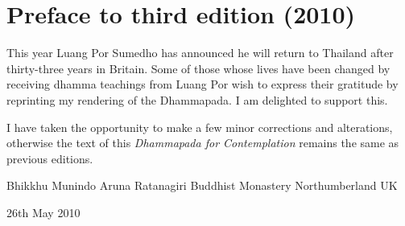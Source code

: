 
\chapter{Preface to third edition (2010)}

This year Luang Por Sumedho has announced he will return to Thailand after thirty-three years in Britain. Some  of  those whose  lives  have  been  changed  by  receiving dhamma  teachings  from  Luang  Por  wish to  express  their  gratitude  by  reprinting my rendering of the Dhammapada. I am delighted to support this. 

I have taken the opportunity to make a few minor corrections and alterations, otherwise the text of this \emph{Dhammapada for Contemplation} remains the same as previous editions. 

Bhikkhu Munindo
Aruna Ratanagiri Buddhist Monastery
Northumberland
UK

26th May 2010
